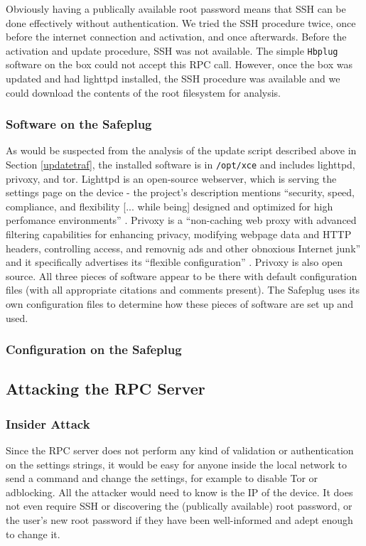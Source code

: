 Obviously having a publically available root password means that SSH can be done effectively without authentication.  We tried the SSH procedure twice, once before the internet connection and activation, and once afterwards.  Before the activation and update procedure, SSH was not available.  The simple \verb!Hbplug! software on the box could not accept this RPC call.  However, once the box was updated and had lighttpd installed, the SSH procedure was available and we could download the contents of the root filesystem for analysis.

    \subsubsection{Software on the Safeplug}
\label{software}
As would be suspected from the analysis of the update script described above in Section \ref{updatetraf}, the installed software is in \verb!/opt/xce! and includes lighttpd, privoxy, and tor.  Lighttpd is an open-source webserver, which is serving the settings page on the device - the project's description mentions ``security, speed, compliance, and flexibility [... while being] designed and optimized for high perfomance environments'' \cite{lighttpd}.  Privoxy is a ``non-caching web proxy with advanced filtering capabilities for enhancing privacy, modifying webpage data and HTTP headers, controlling access, and removnig ads and other obnoxious Internet junk'' and it specifically advertises its ``flexible configuration'' \cite{privoxy}.  Privoxy is also open source.  All three pieces of software appear to be there with default configuration files (with all appropriate citations and comments present).  The Safeplug uses its own configuration files to determine how these pieces of software are set up and used.
    
    \subsubsection{Configuration on the Safeplug}
\label{spconfig}

\subsection{Attacking the RPC Server}

\subsubsection{Insider Attack}
Since the RPC server does not perform any kind of validation or authentication on the settings strings, it would be easy for anyone inside the local network to send a command and change the settings, for example to disable Tor or adblocking.  All the attacker would need to know is the IP of the device.  It does not even require SSH or discovering the (publically available) root password, or the user's new root password if they have been well-informed and adept enough to change it.  

